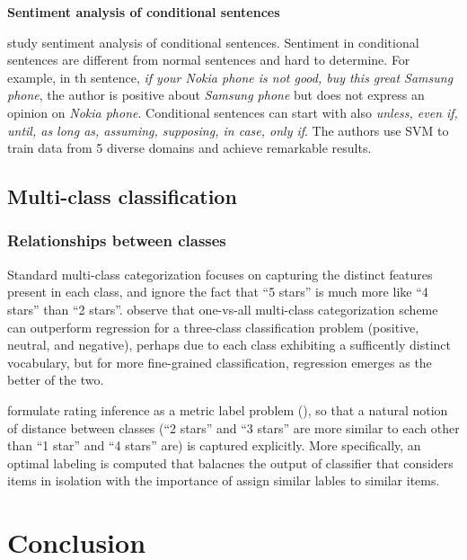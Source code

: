\documentclass{article}
\begin{document}
\begin{multicols}{2}
       \textbf{Sentiment analysis of conditional sentences}

        \citet{Narayanan2009} study sentiment analysis of conditional sentences.
Sentiment in conditional sentences are different from normal sentences and hard
to determine. For example, in th sentence, \textit{if your Nokia phone is not
good, buy this great Samsung phone}, the author is positive about \textit{
Samsung phone} but does not express an opinion on \textit{Nokia phone}.
Conditional sentences can start with also \textit{unless, even if, until, as long
as, assuming, supposing, in case, only if}. The authors use SVM to train data
from 5 diverse domains and achieve remarkable results.


  \subsection{Multi-class classification}
    \subsubsection{Relationships between classes}
        Standard multi-class categorization focuses on capturing the
distinct features present in each class, and ignore the fact that ``5 stars'' is
much more like ``4 stars'' than ``2 stars''. \cite{Pang2005} observe that
one-vs-all multi-class categorization scheme can outperform regression for a
three-class classification problem (positive, neutral, and negative), perhaps
due to each class exhibiting a sufficently distinct vocabulary, but for more
fine-grained classification, regression emerges as the better of the two.
        
        \cite{Pang2005} formulate rating inference as a metric label
problem (\cite{Kleinberg2002}), so that a natural notion of distance between
classes (``2 stars'' and ``3 stars'' are more similar to each other than ``1
star'' and ``4 stars'' are) is captured explicitly. More specifically, an
optimal labeling is computed that balacnes the output of classifier that
considers items in isolation with the importance of assign similar lables to
similar items.

\section{Conclusion}




\end{multicols}
\end{document}
